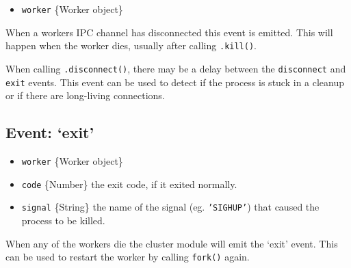 \begin{itemize}
\item
  \texttt{worker} \{Worker object\}
\end{itemize}

When a workers IPC channel has disconnected this event is emitted. This
will happen when the worker dies, usually after calling
\texttt{.kill()}.

When calling \texttt{.disconnect()}, there may be a delay between the
\texttt{disconnect} and \texttt{exit} events. This event can be used to
detect if the process is stuck in a cleanup or if there are long-living
connections.

\begin{Shaded}
\begin{Highlighting}[]
\NormalTok{(}\NormalTok{, }
  \NormalTok{(} \NormalTok{+ } \NormalTok{+ }\NormalTok{);}
\NormalTok{\});}
\end{Highlighting}
\end{Shaded}

\subsection{Event: `exit'}

\begin{itemize}
\item
  \texttt{worker} \{Worker object\}
\item
  \texttt{code} \{Number\} the exit code, if it exited normally.
\item
  \texttt{signal} \{String\} the name of the signal (eg.
  \texttt{'SIGHUP'}) that caused the process to be killed.
\end{itemize}

When any of the workers die the cluster module will emit the `exit'
event. This can be used to restart the worker by calling \texttt{fork()}
again.

\begin{Shaded}
\begin{Highlighting}[]
\NormalTok{(}\NormalTok{, }
   \NormalTok{;}
  \NormalTok{(} \NormalTok{+ } \NormalTok{+ }\NormalTok{);}
  \NormalTok{();}
\NormalTok{\});}
\end{Highlighting}
\end{Shaded}

